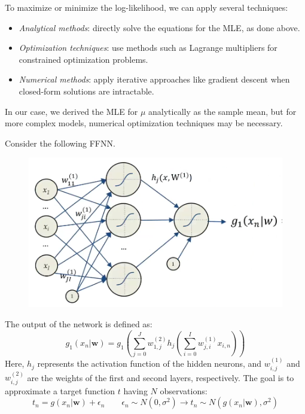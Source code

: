 To maximize or minimize the log-likelihood, we can apply several techniques:
\begin{itemize}
    \item \textit{Analytical methods}: directly solve the equations for the MLE, as done above.
    \item \textit{Optimization techniques}: use methods such as Lagrange multipliers for constrained optimization problems.
    \item \textit{Numerical methods}: apply iterative approaches like gradient descent when closed-form solutions are intractable.
\end{itemize}
In our case, we derived the MLE for $\mu$ analytically as the sample mean, but for more complex models, numerical optimization techniques may be necessary.
\begin{example}
    Consider the following FFNN. 
    \begin{figure}[H]
        \centering
        \includegraphics[width=0.75\linewidth]{images/ffnn1.png}
    \end{figure}
    The output of the network is defined as:
    \[g_1(x_n|\mathbf{w})=g_1\left(\sum_{j=0}^Jw_{1,j}^{(2)}h_j\left(\sum_{i=0}^Iw_{j,i}^{(1)}x_{i,n}\right)\right)\]
    Here, $h_j$ represents the activation function of the hidden neurons, and $w_{i,j}^{(1)}$ and $w_{i,j}^{(2)}$ are the weights of the first and second layers, respectively.
    The goal is to approximate a target function $t$ having $N$ observations: 
    \[t_n=g(x_n|\mathbf{w})+\epsilon_n \qquad \epsilon_n\sim N(0,\sigma^2)\rightarrow t_n\sim N(g(x_n|\mathbf{w}),\sigma^2)\]


\end{example}
